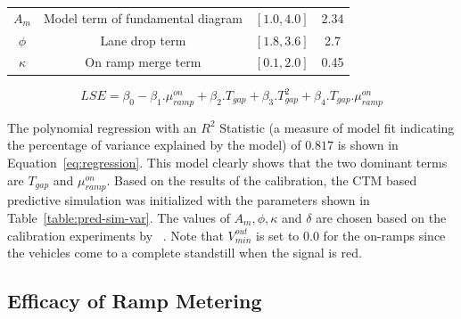 \documentclass[12pt]{article}
\begin{document}
\begin{table}[!htbp]
\begin{tabular}{cclc}
$A_{m}$                                                                  & Model term of fundamental diagram                                                        & \multicolumn{1}{c}{$[1.0, 4.0]$}   & $2.34$                                                              \\
$\phi$                                                                   & Lane drop term                                                                           & $[1.8, 3.6]$                       & 2.7  \\
$\kappa$                                                                   & On ramp merge term                                                                           & $[0.1, 2.0]$                       & 0.45  \\ \hline                                                              
\end{tabular}
\end{table}

 
\begin{equation}
\label{eq:regression}
LSE=\beta_0-\beta_1.\mu^{on}_{ramp}+\beta_2.T_{gap}+\beta_3.T_{gap}^2+\beta_4.T_{gap}.\mu^{on}_{ramp}
\end{equation}

The polynomial regression  with an $R^2$ Statistic (a measure of model fit indicating the percentage of variance explained by the model) of $0.817$ is shown in Equation~\ref{eq:regression}. This model clearly shows that the two dominant terms are $T_{gap}$ and $\mu^{on}_{ramp}$. Based on the results of the calibration, the CTM based predictive simulation was initialized with the parameters shown in Table~\ref{table:pred-sim-var}.  The values of $A_m, \phi, \kappa$ and $\delta$ are chosen based on the calibration experiments by ~\cite{kotsialos2002traffic}. Note that $V_{min}^{out}$ is set to $0.0$ for the on-ramps since the vehicles come to a complete standstill when the signal is red.




\subsection{Efficacy of Ramp Metering}
\label{subsec:results}
\end{document}
